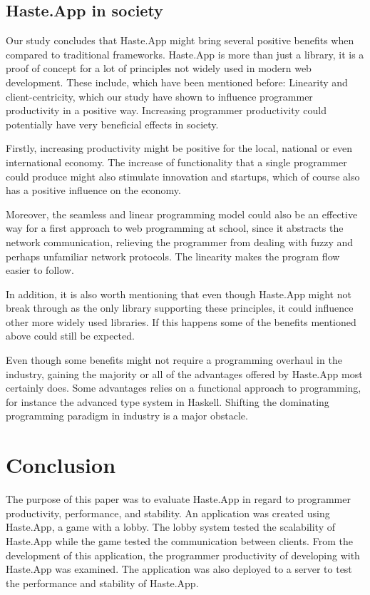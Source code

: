 \documentclass[a4paper]{article}
\begin{document}
\subsection{Haste.App in society}
Our study concludes that Haste.App might bring several positive benefits when compared to traditional frameworks. Haste.App is more than just a library, it is a proof of concept for a lot of principles not widely used in modern web development. These include, which have been mentioned before: Linearity and client-centricity, which our study have shown to influence programmer productivity in a positive way. Increasing programmer productivity could potentially have very beneficial effects in society.

Firstly, increasing productivity might be positive for the local, national or even international economy. The increase of functionality that a single programmer could produce might also stimulate innovation and startups, which of course also has a positive influence on the economy. 

Moreover, the seamless and linear programming model could also be an effective way for a first approach to web programming at school, since it abstracts the network communication, relieving the programmer from dealing with fuzzy and perhaps unfamiliar network protocols. The linearity makes the program flow easier to follow.

In addition, it is also worth mentioning that even though Haste.App might not break through as the only library supporting these principles, it could influence other more widely used libraries. If this happens some of the benefits mentioned above could still be expected.

Even though some benefits might not require a programming overhaul in the industry, gaining the majority or all of the advantages offered by Haste.App most certainly does. Some advantages relies on a functional approach to programming, for instance the advanced type system in Haskell. Shifting the dominating programming paradigm in industry is a major obstacle.

\newpage
\section{Conclusion}
The purpose of this paper was to evaluate Haste.App in regard to programmer productivity, performance, and stability. An application was created using Haste.App, a game with a lobby. The lobby system tested the scalability of Haste.App while the game tested the communication between clients. From the development of this application, the programmer productivity of developing with Haste.App was examined. The application was also deployed to a server to test the performance and stability of Haste.App. 
\end{document}
